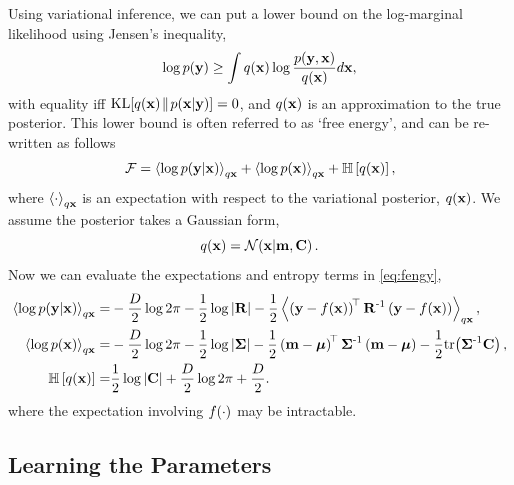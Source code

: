 \documentclass{article} %
\begin{document}
Using variational inference, we can put a lower bound on the log-marginal
likelihood using Jensen's inequality, 
\begin{equation}
    \log p\!\left({\mathbf{y}}\right) \geq \int q\!\left({\mathbf{x}}\right) \log 
        \frac{p\!\left({\mathbf{y}, \mathbf{x}}\right)}{q\!\left({\mathbf{x}}\right)} d\mathbf{x},
\end{equation}
with equality iff $\text{KL}\!\left[{{q\!\left({\mathbf{x}}\right)}\!\parallel\!{p\!\left({\mathbf{x}}\middle\vert{\ensuremath{\mathbf{y}}}\right)}}\right] = 0$, and
$q\!\left({\mathbf{x}}\right)$ is an approximation to the true posterior. This lower bound is
often referred to as `free energy', and can be re-written as follows
\begin{equation}
    \mathcal{F} = \left\langle{\log \ensuremath{p\!\left({\mathbf{y}}\middle\vert{\ensuremath{\mathbf{x}}}\right)}}\right\rangle_{q\mathbf{x}}
        + \left\langle{\log \ensuremath{p\!\left({\mathbf{x}}\right)}}\right\rangle_{q\mathbf{x}} + \mathbb{H}\left[{q\!\left({\mathbf{x}}\right)}\right],
    \label{eq:fengy}
\end{equation}
where $\left\langle{\cdot}\right\rangle_{q\mathbf{x}}$ is an expectation with respect to the
variational posterior, $q\!\left({\mathbf{x}}\right)$. We assume the posterior takes a
Gaussian form,
\begin{equation}
    q\!\left({\mathbf{x}}\right) = \mathcal{N}\!\left({\mathbf{x}}\middle\vert{\ensuremath{\mathbf{m}}, \ensuremath{\mathbf{C}}}\right). \label{eq:varpost}
\end{equation}
Now we can evaluate the expectations and entropy terms in \eqref{eq:fengy},
\begin{align}
    \expec{q\lstate}{\log \probC{\obs}{\lstate}}
        =& - \frac{D}{2}\log{2\pi} - \frac{1}{2} \log\deter{\lcov} 
        - \frac{1}{2} 
            \expec{q\lstate}{\brac{\obs - \nonlin{\lstate}}\transpose\lcov\inv
            \brac{\obs - \nonlin{\lstate}}},
            \label{eq:qlike} \\
    \expec{q\lstate}{\log \prob{\lstate}}
        =& - \frac{D}{2}\log{2\pi} - \frac{1}{2}\log\deter{\prcov}
            - \frac{1}{2} \brac{\pomean - \prmean}\transpose\prcov\inv
            \brac{\pomean - \prmean}
            - \frac{1}{2} \trace{\prcov\inv\pocov},
            \label{eq:qprior} \\
    \entropy{\qrob{\lstate}} =& \frac{1}{2} \log\deter{\pocov} 
        + \frac{D}{2}\log{2\pi} + \frac{D}{2} \label{eq:qentropy}.
\end{align}
where the expectation involving $f\!\left({{\cdot}}\right)$ may be intractable.


\subsection{Learning the Parameters}
\end{document}
